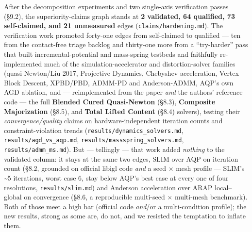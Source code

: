 \documentclass{egpubl}
\begin{document}
After the decomposition experiments and two single-axis verification passes (\S9.2), the
superiority-claims graph stands at \textbf{2 validated, 64 qualified, 73 self-claimed, and 21 unmeasured}
edges (\texttt{claims/hardening.md}). The verification work promoted forty-one edges from self-claimed to
qualified --- ten from the contact-free triage backlog and thirty-one more from a ``try-harder'' pass that
built incremental-potential and mass-spring testbeds and faithfully re-implemented much of the
simulation-accelerator and distortion-solver families (quasi-Newton/Liu-2017, Projective Dynamics,
Chebyshev acceleration, Vertex Block Descent, XPBD/PBD, ADMM-PD and Anderson-ADMM, AQP's own AGD
ablation, and --- reimplemented from the paper \emph{and} the authors' reference code --- the full \textbf{Blended
Cured Quasi-Newton} (\S8.3), \textbf{Composite Majorization} (\S8.5), and \textbf{Total Lifted Content} (\S8.4)
solvers), testing their
\emph{convergence/quality} claims on hardware-independent iteration counts and constraint-violation trends
(\texttt{results/dynamics\_solvers.md}, \texttt{results/agd\_vs\_aqp.md}, \texttt{results/massspring\_solvers.md}, \texttt{results/admm\_ms.md}). But --- tellingly --- that work
added \emph{nothing} to the validated column: it stays at the same two edges,
SLIM over AQP on iteration count (\S8.2, grounded on official libigl code \emph{and} a seed $\times$ mesh profile ---
SLIM's \textasciitilde{}5 iterations, worst case 6, stay below AQP's best case at every one of four resolutions,
\texttt{results/slim.md})
and Anderson acceleration over ARAP local--global on convergence (\S8.6, a reproducible multi-seed $\times$
multi-mesh benchmark). Both of those meet a high bar (official code \emph{and}/or a multi-condition
profile); the new results, strong as some are, do not, and we resisted the temptation to inflate them.
\end{document}
